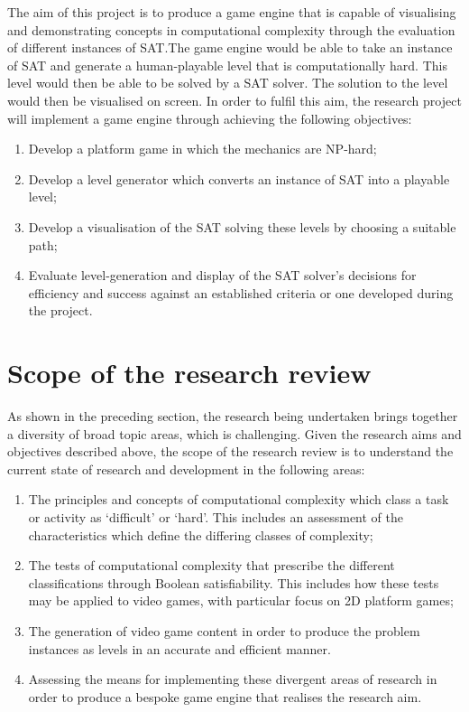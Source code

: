 \documentclass[11pt, a4paper, oneside]{report} %
\begin{document}
The aim of this project is to produce a game engine that is capable of visualising and demonstrating
concepts in computational complexity through the evaluation of different instances of SAT.\@ The
game engine would be able to take an instance of SAT and generate a human-playable level that is computationally hard. This level
would then be able to be solved by a SAT solver. The solution to the level would then be visualised
on screen. In order to fulfil this aim, the research project will implement a game engine through achieving the following objectives:
\\
\begin{enumerate}

  \item Develop a platform game in which the mechanics are NP-hard;   
  \item Develop a level generator which converts an instance of SAT into a playable level;         
  \item Develop a visualisation of the SAT solving these levels by choosing a suitable path;   
  \item Evaluate level-generation and display of the SAT solver's decisions for efficiency and success against an 
        established criteria or one developed during the project. 

\end{enumerate}


\section{Scope of the research review}

As shown in the preceding section, the research being undertaken brings together a diversity of
broad topic areas, which is challenging. Given the research aims and objectives described above, the
scope of the research review is to understand the current state of research and development in the
following areas:

\begin{enumerate}

  \item The principles and concepts of computational complexity which class a task or activity as
  `difficult' or `hard'. This includes an assessment of the characteristics which define the
  differing classes of complexity;

  \item  The tests of computational complexity that prescribe the different classifications through
  Boolean satisfiability. This includes how these tests may be applied to video games, with
  particular focus on 2D platform games;

  \item The generation of video game content in order to produce the problem instances as levels in
  an accurate and efficient manner.

  \item Assessing the means for implementing these divergent areas of research in order to produce a
  bespoke game engine that realises the research aim.


\end{enumerate}
\end{document}

